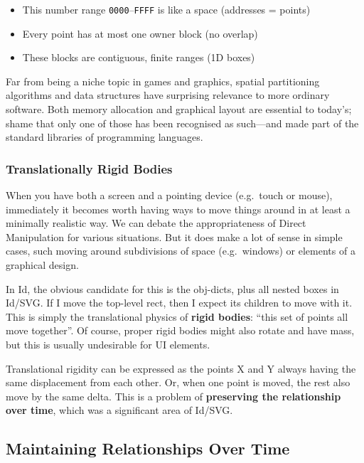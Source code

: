 \begin{itemize}
\tightlist
\item
  This number range \texttt{0000}--\texttt{FFFF} is like a space
  (addresses = points)
\item
  Every point has at most one owner block (no overlap)
\item
  These blocks are contiguous, finite ranges (1D boxes)
\end{itemize}

Far from being a niche topic in games and graphics, spatial partitioning
algorithms and data structures have surprising relevance to more
ordinary software. Both memory allocation and graphical layout are
essential to today's; shame that only one of those has been recognised
as such---and made part of the standard libraries of programming
languages.

\hypertarget{translationally-rigid-bodies}{%
\subsubsection{Translationally Rigid
Bodies}\label{translationally-rigid-bodies}}

When you have both a screen and a pointing device (e.g.~touch or mouse),
immediately it becomes worth having ways to move things around in at
least a minimally realistic way. We can debate the appropriateness of
Direct Manipulation for various situations. But it does make a lot of
sense in simple cases, such moving around subdivisions of space
(e.g.~windows) or elements of a graphical design.

In Id{}, the obvious candidate for this is the obj-dicts, plus all
nested boxes in Id{}/SVG. If I move the top-level rect, then I expect
its children to move with it. This is simply the translational physics
of \textbf{rigid bodies}: ``this set of points all move together''. Of
course, proper rigid bodies might also rotate and have mass, but this is
usually undesirable for UI elements.

Translational rigidity can be expressed as the points X and Y always
having the same displacement from each other. Or, when one point is
moved, the rest also move by the same delta. This is a problem of
\textbf{preserving the relationship over time}, which was a significant
area of Id{}/SVG.

\hypertarget{maintaining-relationships-over-time}{%
\subsection{Maintaining Relationships Over
Time}\label{maintaining-relationships-over-time}}


